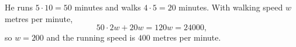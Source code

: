 He runs $5\cdot10=50$ minutes and walks $4\cdot5=20$ minutes. With walking speed $w$ metres per minute,
\[50\cdot2w+20w=120w=24000,\]
so $w=200$ and the running speed is $\boxed{400}$ metres per minute.

